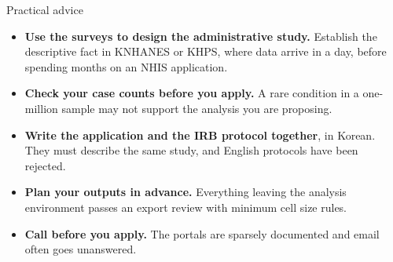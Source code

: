 \documentclass[aspectratio=169,11pt]{beamer}
\newcommand{\hl}[1]{\textbf{\color{kdgreen}#1}}
\begin{document}
\begin{frame}{Practical advice}
  \begin{itemize}
    \setlength{\itemsep}{8pt}
    \item \hl{Use the surveys to design the administrative study.} Establish the
          descriptive fact in KNHANES or KHPS, where data arrive in a day, before
          spending months on an NHIS application.
    \item \hl{Check your case counts before you apply.} A rare condition in a
          one-million sample may not support the analysis you are proposing.
    \item \hl{Write the application and the IRB protocol together}, in Korean. They
          must describe the same study, and English protocols have been rejected.
    \item \hl{Plan your outputs in advance.} Everything leaving the analysis
          environment passes an export review with minimum cell size rules.
    \item \hl{Call before you apply.} The portals are sparsely documented and email
          often goes unanswered.
  \end{itemize}
\end{frame}
\end{document}
